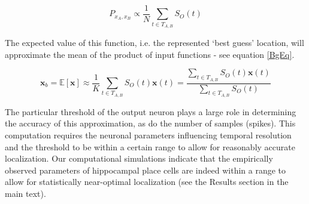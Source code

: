 \begin{equation}\label{CDPostEq}
P_{x_A,x_B} \propto \frac{1}{N} \sum_{t \in T_{A,B}}{S_O(t)}
\end{equation}  

The expected value of this function, i.e. the represented `best guess' location, will approximate the mean of the product of input functions - see equation \eqref{BgEq}.


\begin{equation}\label{CDBgEq}
\boldsymbol x_b = \mathbb{E}[\boldsymbol x] \approx \frac{1}{K} \sum_{t \in T_{A,B}}{S_{O}(t) \boldsymbol x(t)} = \frac{\sum_{t \in T_{A,B}}{S_{O}(t) \boldsymbol x(t)}}{\sum_{t \in T_{A,B}}{S_{O}(t)}} 
\end{equation}  

The particular threshold of the output neuron plays a large role in determining the accuracy of this approximation, as do the number of samples (spikes). This computation requires the neuronal parameters influencing temporal resolution and the threshold to be within a certain range to allow for reasonably accurate localization. Our computational simulations indicate that the empirically observed parameters of hippocampal place cells are indeed within a range to allow for statistically near-optimal localization (see the Results section in the main text).


